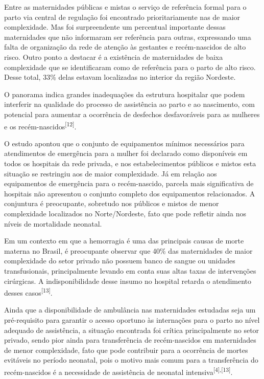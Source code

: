 \documentclass{article}
\begin{document}
Entre as maternidades públicas e mistas o serviço de referência formal para o
parto
via central de regulação foi encontrado prioritariamente nas de maior
complexidade.
Mas foi surpreendente um percentual importante dessas maternidades que não
informaram ser referência para outras, expressando uma falta de organização da
rede
de atenção às gestantes e recém-nascidos de alto risco. Outro ponto a destacar é
a
existência de maternidades de baixa complexidade que se identificaram como de
referência para o parto de alto risco. Desse total, 33\% delas estavam
localizadas no
interior da região Nordeste.

O panorama indica grandes inadequações da estrutura hospitalar que podem
interferir
na qualidade do processo de assistência ao parto e ao nascimento, com potencial
para
aumentar a ocorrência de desfechos desfavoráveis para as mulheres e os
recém-nascidos\textsuperscript{[}\textsuperscript{12}\textsuperscript{]}.

O estudo apontou que o conjunto de equipamentos mínimos necessários para
atendimentos
de emergência para a mulher foi declarado como disponíveis em todos os hospitais
da
rede privada, e nos estabelecimentos públicos e mistos esta situação se
restringiu
aos de maior complexidade. Já em relação aos equipamentos de emergência para o
recém-nascido, parcela mais significativa de hospitais não apresentou o conjunto
completo dos equipamentos relacionados. A conjuntura é preocupante, sobretudo
nos
públicos e mistos de menor complexidade localizados no Norte/Nordeste, fato que
pode
refletir ainda nos níveis de mortalidade neonatal.

Em um contexto em que a hemorragia é uma das principais causas de morte materna
no
Brasil, é preocupante observar que 40\% das maternidades de maior complexidade
do
setor privado não possuem banco de sangue ou unidades transfusionais,
principalmente
levando em conta suas altas taxas de intervenções cirúrgicas. A
indisponibilidade
desse insumo no hospital retarda o atendimento desses casos\textsuperscript{[}\textsuperscript{13}\textsuperscript{]}.

Ainda que a disponibilidade de ambulância nas maternidades estudadas seja um
pré-requisito para garantir o acesso oportuno às internações para o parto no
nível
adequado de assistência, a situação encontrada foi crítica principalmente no
setor
privado, sendo pior ainda para transferência de recém-nascidos em maternidades
de
menor complexidade, fato que pode contribuir para a ocorrência de mortes
evitáveis
no período neonatal, pois o motivo mais comum para a transferência do
recém-nascidos
é a necessidade de assistência de neonatal intensiva\textsuperscript{[}\textsuperscript{4}\textsuperscript{]}\textsuperscript{,}\textsuperscript{[}\textsuperscript{13}\textsuperscript{]}.
\end{document}
